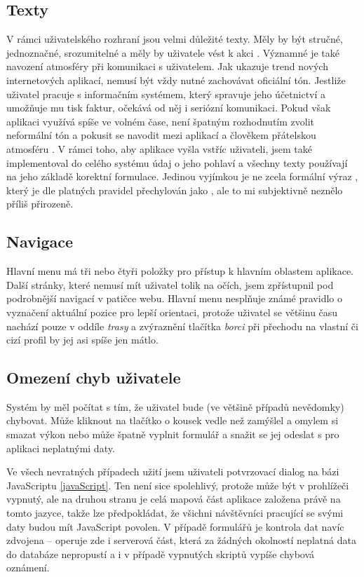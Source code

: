 \subsection{Texty}
V rámci uživatelského rozhraní jsou velmi důležité texty. Měly by být
stručné, jednoznačné, srozumitelné a měly by uživatele vést k akci
\cite{ui}. Významné je také navození atmosféry při komunikaci s
uživatelem. Jak ukazuje trend nových internetových aplikací, nemusí
být vždy nutné zachovávat oficiální tón. Jestliže uživatel pracuje s
informačním systémem, který spravuje jeho účetnictví a umožňuje mu
tisk faktur, očekává od něj i seriózní komunikaci. Pokud však
aplikaci využívá spíše ve volném čase, není špatným rozhodnutím
zvolit neformální tón a pokusit se navodit mezi aplikací a člověkem
přátelskou atmosféru \cite{informalTone}. V rámci toho, aby aplikace
vyšla vstříc uživateli, jsem také implementoval do celého systému
údaj o jeho pohlaví a všechny texty používají na jeho základě
korektní formulace. Jedinou vyjímkou je ne zcela formální výraz
, který je dle platných pravidel přechylován jako
, ale to mi subjektivně neznělo příliš přirozeně.

\subsection{Navigace}
Hlavní menu má tři nebo čtyři položky pro přístup k hlavním
oblastem aplikace. Další stránky, které nemusí mít uživatel tolik na
očích, jsem zpřístupnil pod podrobnější navigací v patičce webu.
Hlavní menu nesplňuje známé pravidlo o vyznačení aktuální pozice pro
lepší orientaci, protože uživatel se většinu času nachází pouze v
oddíle {\it trasy} a zvýraznění tlačítka {\it borci} při přechodu na
vlastní či cizí profil by jej asi spíše jen mátlo.

\subsection{Omezení chyb uživatele}
Systém by měl počítat s tím, že uživatel bude (ve většině případů
nevědomky) chybovat. Může kliknout na tlačítko o kousek vedle než
zamýšlel a omylem si smazat výkon nebo může špatně vyplnit formulář a
snažit se jej odeslat s pro aplikaci neplatnými daty.

Ve všech nevratných případech užití jsem uživateli 
potvrzovací dialog na bázi JavaScriptu \ref{javaScript}. Ten není
sice spolehlivý, protože může být v prohlížeči vypnutý, ale na
druhou stranu je celá mapová část aplikace založena právě na tomto jazyce,
takže lze předpokládat, že všichni návštěvníci pracující se svými
daty budou mít JavaScript povolen. V případě formulářů je kontrola dat
navíc zdvojena -- operuje zde i serverová část, která za žádných
okolností neplatná data do databáze nepropustí a i v případě
vypnutých skriptů vypíše chybová oznámení.

